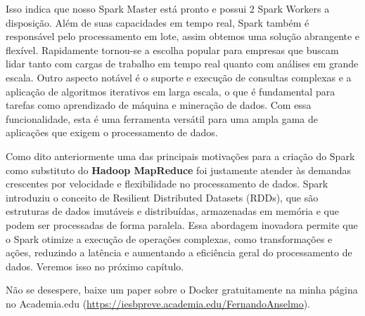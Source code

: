 Isso indica que nosso Spark Master está pronto e possui 2 Spark Workers a disposição. 
Além de suas capacidades em tempo real, Spark também é responsável pelo processamento em lote, assim obtemos uma solução abrangente e flexível. Rapidamente tornou-se a escolha popular para empresas que buscam lidar tanto com cargas de trabalho em tempo real quanto com análises em grande escala. Outro aspecto notável é o suporte e execução de consultas complexas e a aplicação de algoritmos iterativos em larga escala, o que é fundamental para tarefas como aprendizado de máquina e mineração de dados. Com essa funcionalidade, esta é uma ferramenta versátil para uma ampla gama de aplicações que exigem o processamento de dados.

Como dito anteriormente uma das principais motivações para a criação do Spark como substituto do \textbf{Hadoop MapReduce} foi justamente atender às demandas crescentes por velocidade e flexibilidade no processamento de dados. Spark introduziu o conceito de Resilient Distributed Datasets (RDDs), que são estruturas de dados imutáveis e distribuídas, armazenadas em memória e que podem ser processadas de forma paralela. Essa abordagem inovadora permite que o Spark otimize a execução de operações complexas, como transformações e ações, reduzindo a latência e aumentando a eficiência geral do processamento de dados. Veremos isso no próximo capítulo.	

\begin{note} 
	Não se desespere, baixe um paper sobre o Docker gratuitamente na minha página no Academia.edu (\url{https://iesbpreve.academia.edu/FernandoAnselmo}).
\end{note}
\clearpage